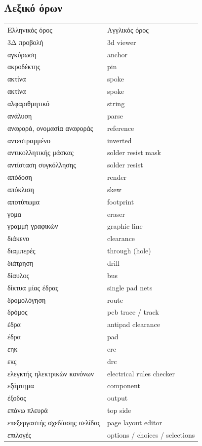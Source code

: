 \documentclass[a4paper]{article}
\begin{document}
\subsection{Λεξικό όρων}
\begin{longtabu}{ l l }
    Ελληνικός όρος	&	Αγγλικός όρος	\\
    3Δ προβολή	&	3d viewer	\\
    αγκύρωση	&	anchor	\\
    ακροδέκτης	&	pin	\\
    ακτίνα	&	spoke	\\
    ακτίνα	&	spoke	\\
    αλφαριθμητικό	&	string	\\
    ανάλυση	&	parse	\\
    αναφορά, ονομασία αναφοράς	&	reference	\\
    αντεστραμμένο	&	inverted	\\
    αντικολλητικής μάσκας	&	solder resist mask	\\
    αντίσταση συγκόλλησης	&	solder resist	\\
    απόδοση	&	render	\\
    απόκλιση	&	skew	\\
    αποτύπωμα	&	footprint	\\
    γομα	&	eraser	\\
    γραμμή γραφικών	&	graphic line	\\
    διάκενο	&	clearance	\\
    διαμπερές	&	through (hole)	\\
    διάτρηση	&	drill	\\
    δίαυλος	&	bus	\\
    δίκτυα μίας έδρας	&	single pad nets	\\
    δρομολόγηση	&	route	\\
    δρόμος	&	pcb trace / track	\\
    έδρα	&	antipad clearance	\\
    έδρα	&	pad	\\
    εηκ	&	erc	\\
    εκς	&	drc	\\
    ελεγκτής ηλεκτρικών κανόνων	&	electrical rules checker	\\
    εξάρτημα	&	component	\\
    έξοδος	&	output	\\
    επάνω πλευρά	&	top side	\\
    επεξεργαστής σχεδίασης σελίδας	&	page layout editor	\\
    επιλογές	&	options / choices / selections	\\

\end{longtabu}
\end{document}
